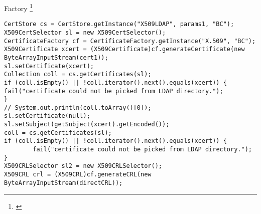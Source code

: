 \begin{pattern}{Factory}
\footnote{\url{}}

\begin{verbatim}
CertStore cs = CertStore.getInstance("X509LDAP", params1, "BC");
X509CertSelector sl = new X509CertSelector();
CertificateFactory cf = CertificateFactory.getInstance("X.509", "BC");
X509Certificate xcert = (X509Certificate)cf.generateCertificate(new ByteArrayInputStream(cert1));
sl.setCertificate(xcert);
Collection coll = cs.getCertificates(sl);
if (coll.isEmpty() || !coll.iterator().next().equals(xcert)) {
fail("certificate could not be picked from LDAP directory.");
}
// System.out.println(coll.toArray()[0]);
sl.setCertificate(null);
sl.setSubject(getSubject(xcert).getEncoded());
coll = cs.getCertificates(sl);
if (coll.isEmpty() || !coll.iterator().next().equals(xcert)) {
        fail("certificate could not be picked from LDAP directory.");
}
X509CRLSelector sl2 = new X509CRLSelector();
X509CRL crl = (X509CRL)cf.generateCRL(new ByteArrayInputStream(directCRL));
\end{verbatim}

\detection{}

\discussion{}

\related{}

\end{pattern}